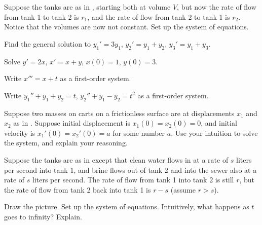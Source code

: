 \begin{exercise}
Suppose the tanks are as in 
, starting both at volume $V$,
but now the rate of flow from tank 1 to tank 2 is $r_1$, and
the rate of flow from tank 2 to tank 1 is $r_2$.
Notice that the volumes are now not constant.  Set up the system of equations.
\end{exercise}

\setcounter{exercise}{100}

\begin{exercise}
Find the general solution to $y_1' = 3 y_1$, $y_2' = y_1 + y_2$,
$y_3' = y_1 + y_3$.
\end{exercise}

\begin{exercise}
Solve $y'=2x$, $x'=x+y$, $x(0)=1$, $y(0)=3$.
\end{exercise}

\begin{exercise}
Write $x''' = x+t$ as a first-order system.
\end{exercise}

\begin{exercise}
Write $y_1'' + y_1 + y_2 = t$, 
$y_2'' + y_1 - y_2 = t^2$ as a first-order system.
\end{exercise}

\begin{exercise}
Suppose two masses on carts on a frictionless surface are at 
displacements $x_1$ and $x_2$ as in .
Suppose initial displacement is $x_1(0)=x_2(0)=0$, and initial velocity is $x_1'(0) = x_2'(0) = a$ for some number $a$.
Use your intuition
to solve the system, and explain your reasoning.
\end{exercise}

\begin{exercise}
Suppose the tanks are as in 
 except that clean water flows in
at a rate of $s$ liters per second into tank 1, and brine flows out of tank 2
and into the sewer also at a rate of $s$ liters per second.
The rate of flow from tank 1 into tank 2 is still $r$, but the rate of flow
from tank 2 back into tank 1 is $r-s$ (assume $r > s$).
\begin{tasks}
\task Draw the picture.
\task Set up the system of equations.
\task Intuitively, what happens as $t$ goes to infinity? Explain.
\end{tasks}
\end{exercise}

